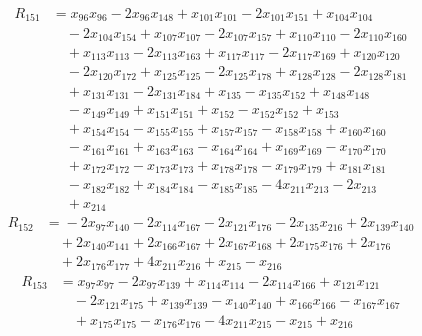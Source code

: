 \begin{align*}
R_{151}&={}x_{96}x_{96} -2x_{96}x_{148} +x_{101}x_{101} -2x_{101}x_{151} +x_{104}x_{104}\\
&\quad{}-2x_{104}x_{154} +x_{107}x_{107} -2x_{107}x_{157} +x_{110}x_{110} -2x_{110}x_{160}\\
&\quad{}+x_{113}x_{113} -2x_{113}x_{163} +x_{117}x_{117} -2x_{117}x_{169} +x_{120}x_{120}\\
&\quad{}-2x_{120}x_{172} +x_{125}x_{125} -2x_{125}x_{178} +x_{128}x_{128} -2x_{128}x_{181}\\
&\quad{}+x_{131}x_{131} -2x_{131}x_{184} +x_{135} -x_{135}x_{152} +x_{148}x_{148}\\
&\quad{}-x_{149}x_{149} +x_{151}x_{151} +x_{152} -x_{152}x_{152} +x_{153}\\
&\quad{}+x_{154}x_{154} -x_{155}x_{155} +x_{157}x_{157} -x_{158}x_{158} +x_{160}x_{160}\\
&\quad{}-x_{161}x_{161} +x_{163}x_{163} -x_{164}x_{164} +x_{169}x_{169} -x_{170}x_{170}\\
&\quad{}+x_{172}x_{172} -x_{173}x_{173} +x_{178}x_{178} -x_{179}x_{179} +x_{181}x_{181}\\
&\quad{}-x_{182}x_{182} +x_{184}x_{184} -x_{185}x_{185} -4x_{211}x_{213} -2x_{213}\\
&\quad{}+x_{214}
\end{align*}
\begin{align*}
R_{152}&={}-2x_{97}x_{140} -2x_{114}x_{167} -2x_{121}x_{176} -2x_{135}x_{216} +2x_{139}x_{140}\\
&\quad{}+2x_{140}x_{141} +2x_{166}x_{167} +2x_{167}x_{168} +2x_{175}x_{176} +2x_{176}\\
&\quad{}+2x_{176}x_{177} +4x_{211}x_{216} +x_{215} -x_{216}
\end{align*}
\begin{align*}
R_{153}&={}x_{97}x_{97} -2x_{97}x_{139} +x_{114}x_{114} -2x_{114}x_{166} +x_{121}x_{121}\\
&\quad{}-2x_{121}x_{175} +x_{139}x_{139} -x_{140}x_{140} +x_{166}x_{166} -x_{167}x_{167}\\
&\quad{}+x_{175}x_{175} -x_{176}x_{176} -4x_{211}x_{215} -x_{215} +x_{216}
\end{align*}
\endgroup
